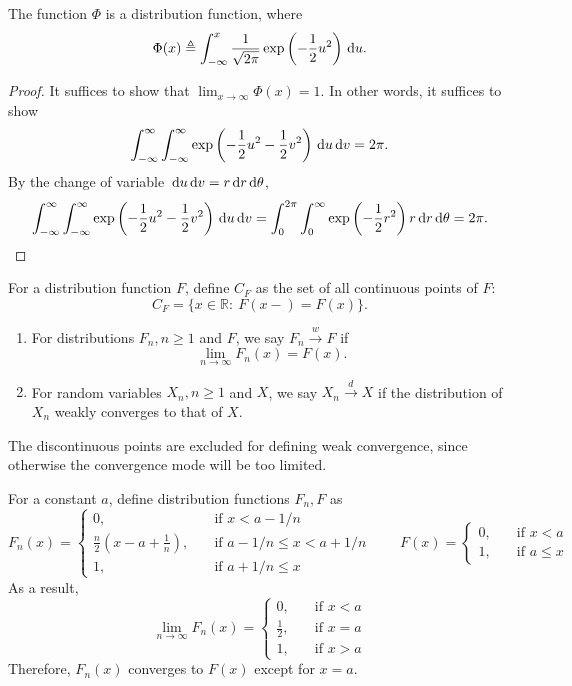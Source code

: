 \begin{proposition}
The function $\Phi$ is a distribution function, where 
\[
 \Phi(x) \triangleq \int_{-\infty}^x\frac{1}{\sqrt{2\pi}}\exp\left(-\frac{1}{2}u^2\right)\,\mathrm{d} u.
\]
\end{proposition}
\begin{proof}
It suffices to show that $\lim_{x\to\infty}\Phi(x)=1$. In other words, it suffices to show 
\[
\int_{-\infty}^\infty\int_{-\infty}^\infty\exp\left(-\frac{1}{2}u^2-\frac{1}{2}v^2\right)\,\mathrm{d} u\,\mathrm{d} v=2\pi.
\]
By the change of variable $\,\mathrm{d} u\,\mathrm{d} v = r\,\mathrm{d} r\,\mathrm{d} \theta$,
\[
\int_{-\infty}^\infty\int_{-\infty}^\infty\exp\left(-\frac{1}{2}u^2-\frac{1}{2}v^2\right)\,\mathrm{d} u\,\mathrm{d} v
=
\int_{0}^{2\pi}\int_0^\infty \exp\left(-\frac{1}{2}r^2\right)r\,\mathrm{d} r\,\mathrm{d}\theta=2\pi.
\]
\end{proof}

\begin{definition}
For a distribution function $F$, define $C_F$ as the set of all continuous points of $F$:
\[
C_F = \{x\in\mathbb{R}:~F(x-)=F(x)\}.
\]
\begin{enumerate}
\item
For distributions $F_n, n\ge1$ and $F$, we say $F_n\xrightarrow{w}F$ if
\[
\lim_{n\to\infty}F_n(x) = F(x).
\]
\item
For random variables $X_n, n\ge1$ and $X$, we say $X_n\xrightarrow{d}X$ if the distribution of $X_n$ weakly converges to that of $X$.
\end{enumerate}
\end{definition}
The discontinuous points are excluded for defining weak convergence, since otherwise the convergence mode will be too limited.

\begin{example}
For a constant $a$, define distribution functions $F_n,F$ as
\[
F_n(x) = \left\{
\begin{aligned}
0,&\quad\text{if $x<a-1/n$}\\
\frac{n}{2}(x - a + \frac{1}{n}),&\quad\text{if $a-1/n\le x < a+1/n$}\\
1,&\quad\text{if $a+1/n\le x$}
\end{aligned}
\right.\qquad
F(x)=\left\{
\begin{aligned}
0,&\quad\text{if $x<a$}\\
1,&\quad\text{if $a\le x$}
\end{aligned}
\right.
\]
As a result,
\[
\lim_{n\to\infty}F_n(x) = \left\{
\begin{aligned}
0,&\quad\text{if $x<a$}\\
\frac{1}{2},&\quad\text{if $x=a$}\\
1,&\quad\text{if $x>a$}
\end{aligned}
\right.
\]
Therefore, $F_n(x)$ converges to $F(x)$ except for $x=a$.
\end{example}

